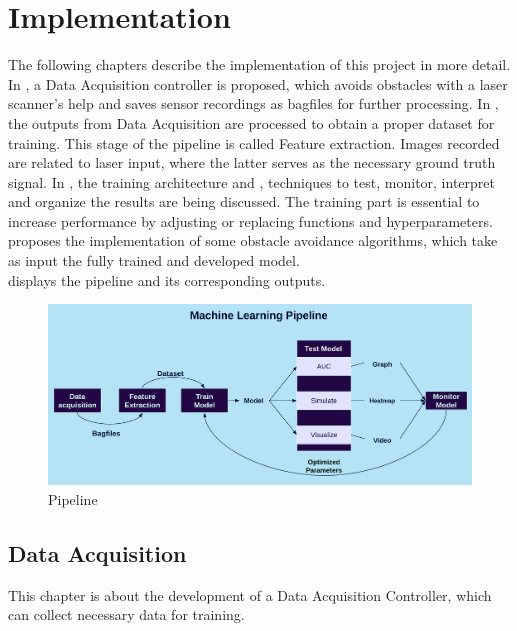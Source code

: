 \section{Implementation \label{Implementation} }
The following chapters describe the implementation of this project in more detail. In , a Data Acquisition controller is proposed, which avoids obstacles with a laser scanner's help and saves sensor recordings as bagfiles for further processing. In , the outputs from Data Acquisition are processed to obtain a proper dataset for training. This stage of the pipeline is called Feature extraction. Images recorded are related to laser input, where the latter serves as the necessary ground truth signal. In , the training architecture and , techniques to test, monitor, interpret and organize the results are being discussed. The training part is essential to increase performance by adjusting or replacing functions and hyperparameters.  proposes the implementation of some obstacle avoidance algorithms, which take as input the fully trained and developed model.\\

 displays the pipeline and its corresponding outputs.\\

\begin{figure}[h]%
\centering
\includegraphics[width=1\textwidth]{Bilder/pipeline.png} 
\caption[]{Pipeline}
\label{pipeline}
\end{figure}
\newpage


\subsection{Data Acquisition \label{DataAcquisition} }
This chapter is about the development of a Data Acquisition
Controller, which can collect necessary data for training.\\

